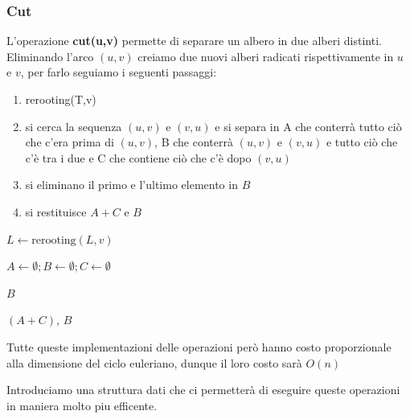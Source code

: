 \subsubsection{Cut}
L'operazione \textbf{cut(u,v)} permette di separare un albero in due alberi distinti. Eliminando l'arco $(u,v)$ creiamo due nuovi alberi radicati rispettivamente in $u$ e $v$, per farlo seguiamo i seguenti passaggi:
\begin{enumerate}
    \item rerooting(T,v)
    \item si cerca la sequenza $(u,v)$ e $(v,u)$ e si separa in A che conterrà tutto ciò che c'era prima di $(u,v)$, B che conterrà $(u,v)$ e $(v,u)$ e tutto ciò che c'è tra i due e C che contiene ciò che c'è dopo $(v,u)$
    \item si eliminano il primo e l'ultimo elemento in $B$
    \item si restituisce $A + C$ e $B$
\end{enumerate}

\begin{algorithm}[H]
    \caption{Cut}
    \label{alg:cut}
    \SetAlgoLined
    \DontPrintSemicolon
    
    
    \BlankLine 

    $L \leftarrow \text{rerooting}(L, v)$\;
    
    $A \leftarrow \emptyset; B \leftarrow \emptyset; C \leftarrow \emptyset$\;
    








     $B$\;

    \Return $(A + C)$, $B$ 
\end{algorithm}

 \begin{remark}
    Tutte queste implementazioni delle operazioni però hanno costo proporzionale alla dimensione del ciclo euleriano, dunque il loro costo sarà $O(n)$
 \end{remark}

Introduciamo una struttura dati che ci permetterà di eseguire queste operazioni in maniera molto piu efficente.

